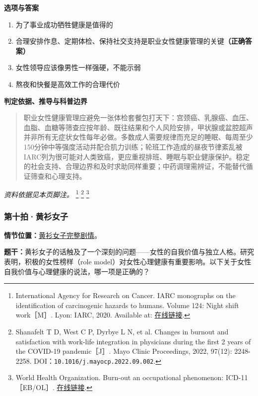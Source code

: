 \textbf{选项与答案}
\begin{enumerate}[label=\Alph*.,leftmargin=*]
  \item 为了事业成功牺牲健康是值得的
  \item 合理安排作息、定期体检、保持社交支持是职业女性健康管理的关键\textbf{（正确答案）}
  \item 女性领导应该像男性一样强硬，不能示弱
  \item 熬夜和快餐是高效工作的合理代价
\end{enumerate}
\textbf{判定依据、推导与科普边界}
\begin{quote}职业女性健康管理应避免一张体检套餐包打天下：宫颈癌、乳腺癌、血压、血脂、血糖等筛查应按年龄、既往结果和个人风险安排，甲状腺或盆腔超声并非所有无症状女性每年必做。多数成人需要规律而充足的睡眠、每周至少150分钟中等强度活动并配合肌力训练；轮班工作造成的昼夜节律紊乱被IARC列为很可能对人类致癌，更应重视排班、睡眠与职业健康保护。稳定的社会支持、合理边界和及时求助同样重要；中药调理需辨证，不能替代循证筛查和心理支持。\end{quote}
\noindent\textit{资料依据见本页脚注。}
\footnote{International Agency for Research on Cancer. IARC monographs on the identification of carcinogenic hazards to humans. Volume 124: Night shift work［M］. Lyon: IARC, 2020. Available at: \href{https://publications.iarc.who.int/Book-And-Report-Series/Iarc-Monographs-On-The-Identification-Of-Carcinogenic-Hazards-To-Humans/Night-Shift-Work-2020}{在线链接}.}
\footnote{Shanafelt T D, West C P, Dyrbye L N, et al. Changes in burnout and satisfaction with work-life integration in physicians during the first 2 years of the COVID-19 pandemic［J］. Mayo Clinic Proceedings, 2022, 97(12): 2248-2258. DOI：\nolinkurl{10.1016/j.mayocp.2022.09.002}.}
\footnote{World Health Organization. Burn-out an occupational phenomenon: ICD-11［EB/OL］. \href{https://www.who.int/standards/classifications/frequently-asked-questions/burn-out-an-occupational-phenomenon}{在线链接}.}

\subsubsection{第十拍·黄衫女子}\label{question:zhouzhiruo:10}
\textbf{情节位置：}\hyperref[plot:zhouzhiruo:10]{黄衫女子完整剧情}。

\textbf{题干：}黄衫女子的话触及了一个深刻的问题——女性的自我价值与独立人格。研究表明，积极的女性榜样（role model）对女性心理健康有重要影响。以下关于女性自我价值与心理健康的说法，哪一项是正确的？

